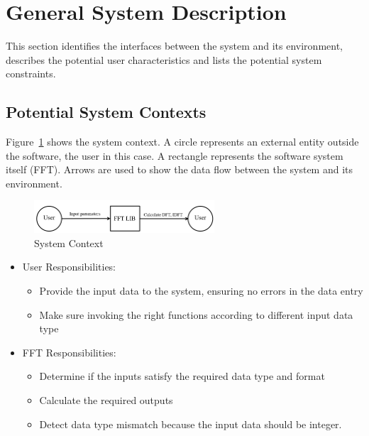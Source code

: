 \documentclass[12pt]{article}
\newcommand{\famname}{FFT} %
\begin{document}
\section{General System Description}

This section identifies the interfaces between the system and its environment,
describes the potential user characteristics and lists the potential system
constraints.

\subsection{Potential System Contexts}
Figure~\ref{Fig_SystemContext} shows the system context.  A circle represents an
external entity outside the software, the user in this case.  A rectangle
represents the software system itself (\famname{}).  Arrows are used to show the data
flow between the system and its environment.\\


\begin{figure}[h!]
\begin{center}
 \includegraphics[width=0.6\textwidth]{SystemContextFigure}
\caption{System Context}
\label{Fig_SystemContext} 
\end{center}
\end{figure}

\begin{itemize}
\item User Responsibilities:
\begin{itemize}
\item  Provide the input data to the system, ensuring no errors in the data entry
\item  Make sure invoking the right functions according to different input data type
\end{itemize}
\item \famname{} Responsibilities:
\begin{itemize}
\item Determine if the inputs satisfy the required data type and format
\item Calculate the required outputs
\item Detect data type mismatch because the input data should be integer.
\end{itemize}
\end{itemize}
\end{document}
